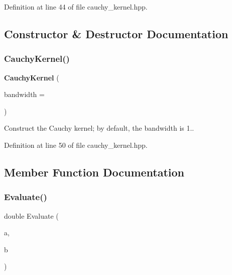 Definition at line 44 of file cauchy\+\_\+kernel.\+hpp.



\subsection{Constructor \& Destructor Documentation}
\mbox{\label{classmlpack_1_1kernel_1_1CauchyKernel_a928140be61e55757b48e7e02b1719400}} 
\subsubsection{Cauchy\+Kernel()}
{\footnotesize\ttfamily \textbf{ Cauchy\+Kernel} (\begin{DoxyParamCaption}\item[{double}]{bandwidth = {} }\end{DoxyParamCaption})\hspace{0.3cm}{\ttfamily [inline]}}



Construct the Cauchy kernel; by default, the bandwidth is 1.. 



Definition at line 50 of file cauchy\+\_\+kernel.\+hpp.



\subsection{Member Function Documentation}
\mbox{\label{classmlpack_1_1kernel_1_1CauchyKernel_a7bc3cfc0ee3750ba84ee4dc7f62994ae}} 
\subsubsection{Evaluate()}
{\footnotesize\ttfamily double Evaluate (\begin{DoxyParamCaption}\item[{const Vec\+TypeA \&}]{a,  }\item[{const Vec\+TypeB \&}]{b }\end{DoxyParamCaption})\hspace{0.3cm}{\ttfamily [inline]}}




